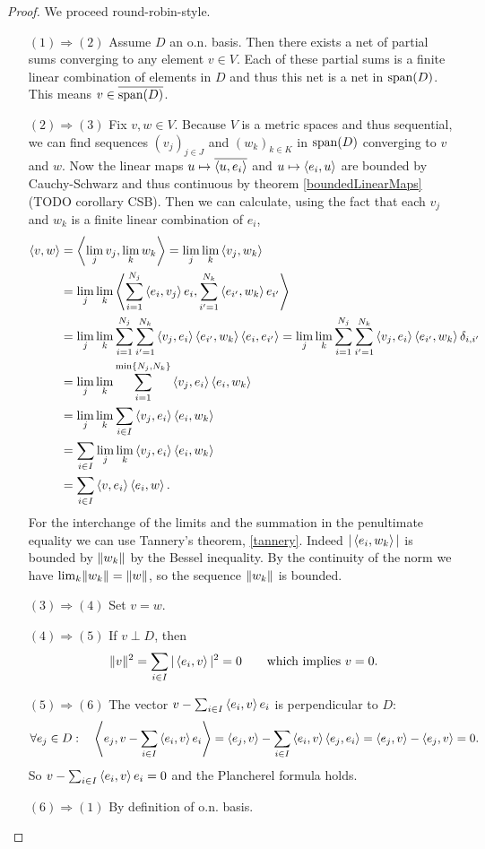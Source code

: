 \begin{proof}
We proceed round-robin-style.
\begin{itemize}[leftmargin=2cm]
\item[$\boxed{(1) \Rightarrow (2)}$] Assume $D$ an o.n. basis. Then there exists a net of partial sums converging to any element $v\in V$. Each of these partial sums is a finite linear combination of elements in $D$ and thus this net is a net in $\operatorname{span}(D)$. This means $v\in\overline{\operatorname{span}(D)}$.
\item[$\boxed{(2) \Rightarrow (3)}$] Fix $v,w\in V$. Because $V$ is a metric spaces and thus sequential, we can find sequences $(v_j)_{j\in J}$ and $(w_k)_{k\in K}$ in $\operatorname{span}(D)$ converging to $v$ and $w$. Now the linear maps $u\mapsto \overline{\left\langle u, e_i \right\rangle}$ and $u\mapsto \left\langle e_i, u \right\rangle$ are bounded by Cauchy-Schwarz and thus continuous by theorem \ref{boundedLinearMaps} (TODO corollary CSB). Then we can calculate, using the fact that each $v_j$ and $w_k$ is a finite linear combination of $e_i$,
\begin{align*}
\left\langle v,w \right\rangle &= \left\langle \lim_{j}v_j, \lim_k w_k \right\rangle = \lim_{j}\lim_{k}\left\langle v_j,w_k \right\rangle \\
&= \lim_{j}\lim_{k}\left\langle \sum_{i=1}^{N_{j}}\left\langle e_i,v_j \right\rangle e_i,\sum_{i'=1}^{N_k}\left\langle e_{i'},w_k \right\rangle e_{i'} \right\rangle \\
&= \lim_{j}\lim_{k}\sum_{i=1}^{N_{j}}\sum_{i'=1}^{N_k}\left\langle v_j,e_i \right\rangle\left\langle e_{i'},w_k \right\rangle\left\langle e_i,e_{i'} \right\rangle = \lim_{j}\lim_{k}\sum_{i=1}^{N_{j}}\sum_{i'=1}^{N_k}\left\langle v_j,e_i \right\rangle\left\langle e_{i'},w_k \right\rangle\delta_{i,i'} \\
&= \lim_{j}\lim_{k}\sum_{i=1}^{\min\{N_{j},N_{k}\}}\left\langle v_j,e_i \right\rangle\left\langle e_i,w_k \right\rangle \\
&= \lim_{j}\lim_{k}\sum_{i\in I}\left\langle v_j,e_i \right\rangle\left\langle e_i,w_k \right\rangle \\
&= \sum_{i\in I}\lim_{j}\lim_{k}\left\langle v_j,e_i \right\rangle\left\langle e_i,w_k \right\rangle \\
&= \sum_{i\in I}\left\langle v,e_i \right\rangle\left\langle e_i,w \right\rangle.
\end{align*}
For the interchange of the limits and the summation in the penultimate equality we can use Tannery's theorem, \ref{tannery}. Indeed $|\left\langle e_i,w_k \right\rangle|$ is bounded by $\lVert w_k\rVert$ by the Bessel inequality. By the continuity of the norm we have $\lim_k \lVert w_k\rVert = \lVert w\rVert$, so the sequence $\lVert w_k\rVert$ is bounded.
\item[$\boxed{(3) \Rightarrow (4)}$] Set $v=w$.
\item[$\boxed{(4) \Rightarrow (5)}$] If $v\perp D$, then
\[ \lVert v\rVert^2 = \sum_{i\in I}|\left\langle e_i,v \right\rangle|^2 = 0 \qquad\text{which implies $v=0$.} \]
\item[$\boxed{(5) \Rightarrow (6)}$] The vector $v-\sum_{i\in I}\left\langle e_i,v \right\rangle e_i$ is perpendicular to $D$:
\[ \forall e_j\in D: \quad \left\langle e_j, v-\sum_{i\in I}\left\langle e_i,v \right\rangle e_i \right\rangle = \left\langle e_j, v \right\rangle-\sum_{i\in I}\left\langle e_i,v \right\rangle\left\langle e_j,e_i \right\rangle = \left\langle e_j, v \right\rangle - \left\langle e_j, v \right\rangle = 0. \]
So $v-\sum_{i\in I}\left\langle e_i,v \right\rangle e_i = 0$ and the Plancherel formula holds.
\item[$\boxed{(6) \Rightarrow (1)}$] By definition of o.n. basis.
\end{itemize}
\end{proof}

